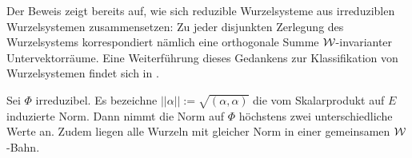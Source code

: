 \begin{bem}
  Der Beweis zeigt bereits auf, wie sich reduzible Wurzelsysteme aus irreduziblen Wurzelsystemen zusammensetzen:
  Zu jeder disjunkten Zerlegung des Wurzelsystems korrespondiert nämlich eine orthogonale Summe $\mathcal{W}$\hyp{}invarianter Untervektorräume.
  Eine Weiterführung dieses Gedankens zur Klassifikation von Wurzelsystemen findet sich in \cite[S.57ff.]{humphreys1972introduction}.
\end{bem}

\newpage
\begin{lem}
  \label{lem:rootLength}
  Sei $\Phi$ irreduzibel.
  Es bezeichne $||\alpha|| := \sqrt{(\alpha,\alpha)}$ die vom Skalarprodukt auf $E$ induzierte Norm.
  Dann nimmt die Norm auf $\Phi$ höchstens zwei unterschiedliche Werte an.
  Zudem liegen alle Wurzeln mit gleicher Norm in einer gemeinsamen $\mathcal{W}$\hyp{}Bahn.
\end{lem}

